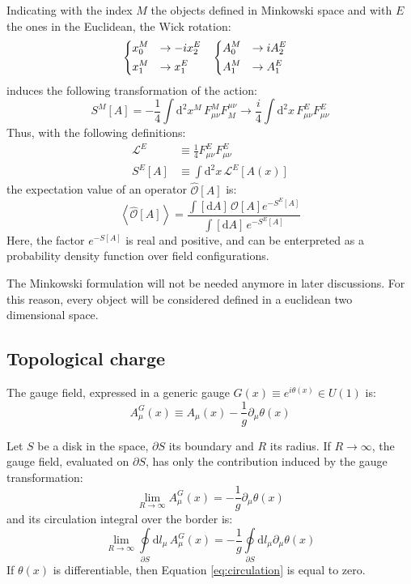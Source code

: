Indicating with the index $M$ the objects defined in Minkowski space and with $E$ the ones in the Euclidean, the Wick rotation:
\begin{align*}
    &\begin{dcases}
        x_0^M &\rightarrow -i x_2^E \\
        x_1^M &\rightarrow x_1^E
    \end{dcases}%
    &%
    \begin{dcases}
        A^M_0 &\rightarrow i A^E_2 \\
        A^M_1 &\rightarrow A^E_1 
    \end{dcases}&
\end{align*}
induces the following transformation of the action:
\[
    S^M[A] = -\frac{1}{4}\int\mathrm d^2x^M\,F^M_{\mu\nu}F_M^{\mu\nu} \rightarrow  \frac{i}{4}\int\mathrm d^2x\,F^E_{\mu\nu}F^E_{\mu\nu}
\]
Thus, with the following definitions:
\begin{equation}\label{eq:cont_action}
    \begin{aligned}
        \mathcal L^E &\equiv \frac{1}{4}F^E_{\mu\nu}F^E_{\mu\nu} \\
        S^E[A] &\equiv \int\mathrm d^2x\,\mathcal L^E[A(x)]
    \end{aligned}
\end{equation}
the expectation value of an operator $\widehat{\mathcal O}[A]$ is:
\begin{equation}\label{eq:cont_exp}
    \left< \widehat{\mathcal O}[A] \right> = \frac{\int[\mathrm dA]\, \mathcal O[A] e^{-S^E[A]}}{\int[\mathrm dA]\,e^{-S^E[A]}}
\end{equation}
Here, the factor $e^{-S[A]}$ is real and positive, and can be enterpreted as a probability density function over field configurations.

The Minkowski formulation will not be needed anymore in later discussions.
For this reason, every object will be considered defined in a euclidean two dimensional space.

\subsection*{Topological charge}

The gauge field, expressed in a generic gauge $G(x) \equiv e^{i\theta(x)} \in U(1)$ is:
\[
    A^G_\mu(x) \equiv A_\mu(x) - \frac{1}{g}\partial_\mu\theta(x)
\]

Let $S$ be a disk in the space, $\partial S$ its boundary and $R$ its radius.
If $R \to \infty$, the gauge field, evaluated on $\partial S$,
has only the contribution induced by the gauge transformation:
\[
    \lim_{R\to\infty}A^G_\mu(x) = -\frac{1}{g}\partial_\mu\theta(x)
\]
and its circulation integral over the border is:
\begin{equation}\label{eq:circulation}
    \lim_{R\to\infty}\oint\limits_{\partial S}\mathrm dl_\mu\,A^G_\mu(x) = -\frac{1}{g}\oint\limits_{\partial S}\mathrm dl_\mu\partial_\mu\theta(x)
\end{equation}
If $\theta(x)$ is differentiable, then Equation \eqref{eq:circulation} is equal to zero.

